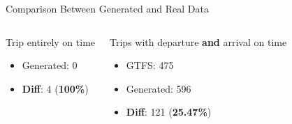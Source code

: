 \documentclass[xcolor=dvipsnames,table]{beamer}
\begin{document}
\begin{frame}{Comparison Between Generated and Real Data}
\begin{columns}
\begin{block}{Trip entirely on time}
\begin{itemize}
                                \item Generated: 0 
                                \item \textbf{Diff}: 4 (\textbf{100\%}) 
                        \end{itemize}
                \end{block}
                \begin{block}{Trips with departure \textbf{and} arrival on time} 
                        \begin{itemize}
                                \item GTFS: 475 
                                \item Generated: 596
                                \item \textbf{Diff}: 121 (\textbf{25.47\%})
                        \end{itemize}
                \end{block}
        \end{columns}
\end{frame}
\end{document}
